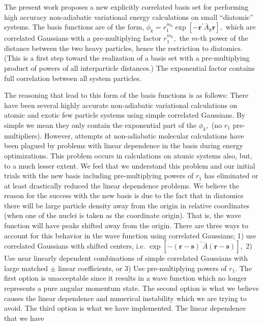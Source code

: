 \documentclass[12pt]{article}
\begin{document}
The present work proposes a new explicitly correlated basis set for performing
high accuracy non-adiabatic variational energy calculations on small
``diatomic'' systems. The basis functions are of the form,  $\phi_{k}%
=r_{1}^{m_{k}}\exp[-\mathbf{r}^{\prime}\bar{A}_{k}\mathbf{r}],$ which are
correlated Gaussians with a pre-multiplying factor $r_{1}^{m_{k}},$ the $m$-th
power of the distance between the two heavy particles, hence the restriction
to diatomics. (This is a first step toward the realization of a basis set with
a pre-multiplying product of powers of all interparticle distances.) The
exponential factor contains full correlation between all system particles.

The reasoning that lead to this form of the basis functions is as follows:
There have been several highly accurate non-adiabatic variational calculations
on atomic and exotic few particle systems using simple correlated
Gaussians\cite{Kinghorn93,Kinghorn95b,Kozlowski93b,Kinghorn97a,Varga96}. By
simple we mean they only contain the exponential part of the $\phi_{k},$ (no
$r_{1}$ pre-multipliers). However, attempts at non-adiabatic molecular
calculations have been plagued by problems with linear dependence in the basis
during energy optimizations. This problem occurs in calculations on atomic
systems also, but, to a much lesser extent. We feel that we understand this
problem and our initial trials with the new basis including pre-multiplying
powers of $r_{1}$ has eliminated or at least drastically reduced the linear
dependence problems. We believe the reason for the success with the new basis
is due to the fact that in diatomics there will be large particle density away
from the origin in relative coordinates (when one of the nuclei is taken as
the coordinate origin). That is, the wave function will have peaks shifted
away from the origin. There are three ways to account for this behavior in the
wave function using correlated Gaussians; 1) use correlated Gaussians with
shifted centers, i.e. $\exp[-\left(  \mathbf{r-s}\right)  ^{\prime
}\bar{A}\left(  \mathbf{r-s}\right)  ],$ 2) Use near linearly dependent
combinations of simple correlated Gaussians with large matched $\pm$ linear
coefficients, or 3) Use pre-multiplying powers of $r_{1}$. The first option is
unacceptable since it results in a wave function which no longer represents a
pure angular momentum state. The second option is what we believe causes the
linear dependence and numerical instability which we are trying to avoid. The
third option is what we have implemented. The linear dependence that we have
\end{document}
